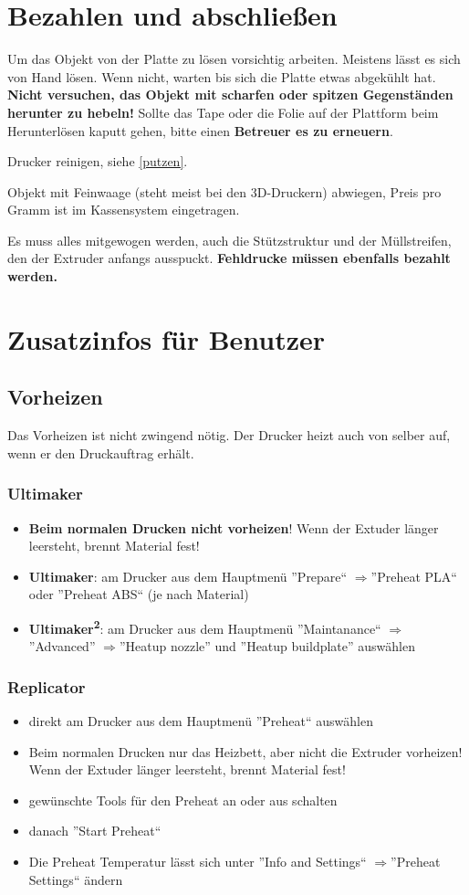 \documentclass{\basedir/fablab-document}
\newcommand{\ts}[1]{\textsuperscript{#1}}
\newcommand{\ra}{$\Rightarrow$}
\begin{document}
\section{Bezahlen und abschließen}

Um das Objekt von der Platte zu lösen vorsichtig arbeiten. Meistens lässt es sich von Hand lösen. Wenn nicht,
warten bis sich die Platte etwas abgekühlt hat. \textbf{Nicht versuchen, das Objekt mit scharfen oder spitzen Gegenständen herunter zu hebeln!}
Sollte das Tape oder die Folie auf der Plattform beim Herunterlösen kaputt gehen, bitte einen \textbf{Betreuer es zu erneuern}.

Drucker reinigen, siehe \ref{putzen}.

Objekt mit Feinwaage (steht meist bei den 3D-Druckern) abwiegen, Preis pro Gramm ist im Kassensystem eingetragen. 

Es muss alles mitgewogen werden, auch die Stützstruktur und der Müllstreifen, den der Extruder anfangs ausspuckt. \textbf{Fehldrucke müssen ebenfalls bezahlt werden.}
\section{Zusatzinfos für Benutzer}
\subsection{Vorheizen} \label{vorheizen}
Das Vorheizen ist nicht zwingend nötig. Der Drucker heizt auch von selber auf, wenn er den Druckauftrag erhält.

\subsubsection{Ultimaker}
\begin{itemize}
	\item \textbf{Beim normalen Drucken nicht vorheizen}! Wenn der Extuder länger leersteht, brennt Material fest!
    \item \textbf{Ultimaker}: am Drucker aus dem Hauptmenü ''Prepare`` \ra ''Preheat PLA`` oder ''Preheat ABS`` (je nach Material)
    \item \textbf{Ultimaker\ts2}: am Drucker aus dem Hauptmenü ''Maintanance`` \ra ''Advanced'' \ra ''Heatup nozzle'' und ''Heatup buildplate'' auswählen
\end{itemize}

\subsubsection{Replicator}
\begin{itemize}
 \item direkt am Drucker aus dem Hauptmenü ''Preheat`` auswählen
 \item Beim normalen Drucken nur das Heizbett, aber nicht die Extruder vorheizen! Wenn der Extuder länger leersteht, brennt Material fest!
 \item gewünschte Tools für den Preheat an oder aus schalten
 \item danach ''Start Preheat``
 \item Die Preheat Temperatur lässt sich unter ''Info and Settings`` \ra ''Preheat Settings`` ändern
\end{itemize}
\end{document}
